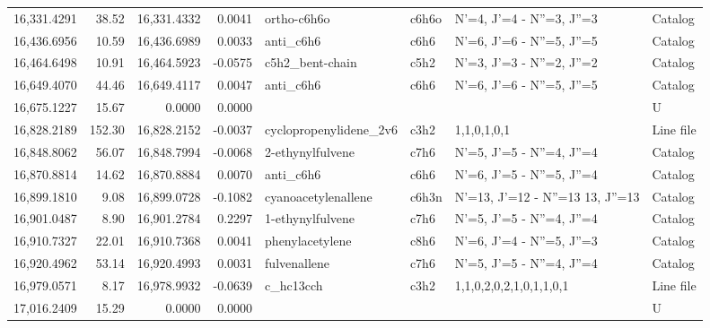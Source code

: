 \begin{longtable}{rrrrllll}
16,331.4291 &     38.52 &       16,331.4332 &    0.0041 &                 ortho-c6h6o &   c6h6o &            N'=4, J'=4 - N''=3, J''=3 &    Catalog \\
16,436.6956 &     10.59 &       16,436.6989 &    0.0033 &                   anti_c6h6 &    c6h6 &            N'=6, J'=6 - N''=5, J''=5 &    Catalog \\
16,464.6498 &     10.91 &       16,464.5923 &   -0.0575 &             c5h2_bent-chain &    c5h2 &            N'=3, J'=3 - N''=2, J''=2 &    Catalog \\
16,649.4070 &     44.46 &       16,649.4117 &    0.0047 &                   anti_c6h6 &    c6h6 &            N'=6, J'=6 - N''=5, J''=5 &    Catalog \\
16,675.1227 &     15.67 &            0.0000 &    0.0000 &                             &         &                                      &          U \\
16,828.2189 &    152.30 &       16,828.2152 &   -0.0037 &      cyclopropenylidene_2v6 &    c3h2 &                          1,1,0,1,0,1 &  Line file \\
16,848.8062 &     56.07 &       16,848.7994 &   -0.0068 &            2-ethynylfulvene &    c7h6 &            N'=5, J'=5 - N''=4, J''=4 &    Catalog \\
16,870.8814 &     14.62 &       16,870.8884 &    0.0070 &                   anti_c6h6 &    c6h6 &            N'=6, J'=5 - N''=5, J''=4 &    Catalog \\
16,899.1810 &      9.08 &       16,899.0728 &   -0.1082 &         cyanoacetylenallene &   c6h3n &  N'=13, J'=12 - N''=13    13, J''=13 &    Catalog \\
16,901.0487 &      8.90 &       16,901.2784 &    0.2297 &            1-ethynylfulvene &    c7h6 &            N'=5, J'=5 - N''=4, J''=4 &    Catalog \\
16,910.7327 &     22.01 &       16,910.7368 &    0.0041 &             phenylacetylene &    c8h6 &            N'=6, J'=4 - N''=5, J''=3 &    Catalog \\
16,920.4962 &     53.14 &       16,920.4993 &    0.0031 &                fulvenallene &    c7h6 &            N'=5, J'=5 - N''=4, J''=4 &    Catalog \\
16,979.0571 &      8.17 &       16,978.9932 &   -0.0639 &                   c_hc13cch &    c3h2 &              1,1,0,2,0,2,1,0,1,1,0,1 &  Line file \\
17,016.2409 &     15.29 &            0.0000 &    0.0000 &                             &         &                                      &          U \\

\end{longtable}
